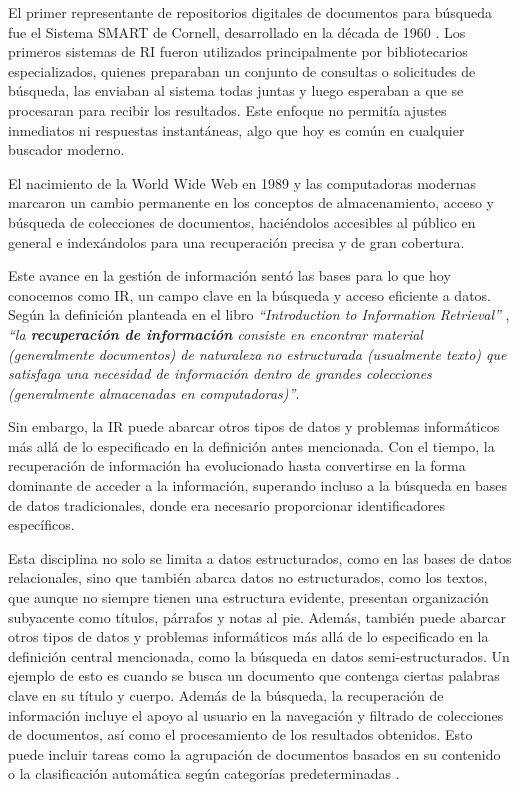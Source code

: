 El primer representante de repositorios digitales de documentos para búsqueda fue 
el Sistema SMART de Cornell, desarrollado en la década de 1960 \cite{Salton1965}. 
Los primeros sistemas de RI fueron utilizados principalmente por bibliotecarios 
especializados, quienes preparaban un conjunto de consultas o solicitudes de búsqueda, 
las enviaban al sistema todas juntas y luego esperaban a que se procesaran para recibir 
los resultados. Este enfoque no permitía ajustes inmediatos ni respuestas instantáneas, 
algo que hoy es común en cualquier buscador moderno.

El nacimiento de la World Wide Web \cite{Wikipedia} en 1989 y las computadoras modernas 
marcaron un cambio permanente en los conceptos de almacenamiento, acceso y búsqueda 
de colecciones de documentos, haciéndolos accesibles al público en general e indexándolos 
para una recuperación precisa y de gran cobertura.

Este avance en la gestión de información sentó las bases para lo que hoy conocemos 
como IR, un campo clave en la búsqueda y acceso eficiente a datos. 
Según la definición planteada en el libro \textit{``Introduction to Information Retrieval''} \cite{Manning2008}, 
\textit{``la \textbf{recuperación de información} consiste en encontrar material 
(generalmente documentos) de naturaleza no estructurada (usualmente texto) que satisfaga 
una necesidad de información dentro de grandes colecciones 
(generalmente almacenadas en computadoras)''}.

Sin embargo, la IR puede abarcar otros tipos de datos y problemas informáticos 
más allá de lo especificado en la definición antes mencionada. Con el tiempo, 
la recuperación de información ha evolucionado hasta convertirse en la forma 
dominante de acceder a la información, superando incluso a la búsqueda en bases 
de datos tradicionales, donde era necesario proporcionar identificadores específicos.

Esta disciplina no solo se limita a datos estructurados, como en las bases de datos 
relacionales, sino que también abarca datos no estructurados, como los textos, 
que aunque no siempre tienen una estructura evidente, presentan organización 
subyacente como títulos, párrafos y notas al pie. Además, también puede abarcar 
otros tipos de datos y problemas informáticos más allá de lo especificado en la definición 
central mencionada, como la búsqueda en datos semi-estructurados. Un ejemplo de esto 
es cuando se busca un documento que contenga ciertas palabras clave en su título y cuerpo. 
Además de la búsqueda, la recuperación de información incluye el apoyo al usuario en la 
navegación y filtrado de colecciones de documentos, así como el procesamiento de los 
resultados obtenidos. Esto puede incluir tareas como la agrupación de documentos 
basados en su contenido o la clasificación automática según categorías 
predeterminadas \cite{Manning2008}.

